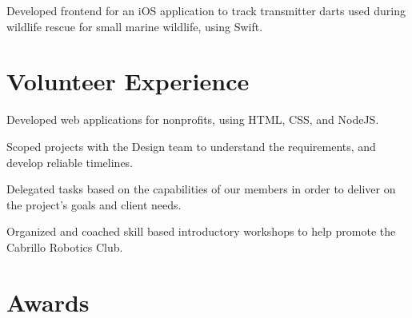\documentclass[]{deedy-resume-openfont}
\begin{document}
\begin{minipage}[t]{0.66\textwidth}
\location

\begin{tightemize}
\item Developed frontend for an iOS application to track transmitter darts used during wildlife rescue for small marine wildlife, using Swift.
\end{tightemize}
\sectionsep

\section{Volunteer Experience}

\begin{tightemize}
\item Developed web applications for nonprofits, using HTML, CSS, and NodeJS. 
\item Scoped projects with the Design team  to understand the requirements, and develop reliable timelines.
\item Delegated tasks based on the  capabilities of our members in order to deliver on the project's goals and client needs. 
\end{tightemize}
\sectionsep


\begin{tightemize}
\item Organized and coached skill based introductory workshops to help promote the Cabrillo Robotics Club. 
\end{tightemize}
\sectionsep


\section{Awards} 
\sectionsep


\end{minipage} 
\end{document}
